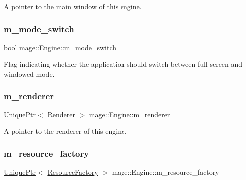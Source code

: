 A pointer to the main window of this engine. \hypertarget{classmage_1_1_engine_aa5cb2e0b7bb2c4a9020e79ab832ee221}{}\label{classmage_1_1_engine_aa5cb2e0b7bb2c4a9020e79ab832ee221} 
\subsubsection{\texorpdfstring{m\+\_\+mode\+\_\+switch}{m\_mode\_switch}}
{\footnotesize\ttfamily bool mage\+::\+Engine\+::m\+\_\+mode\+\_\+switch\hspace{0.3cm}{\ttfamily [private]}}

Flag indicating whether the application should switch between full screen and windowed mode. \hypertarget{classmage_1_1_engine_a1248b7c21bc8256c72d372c12ed1ee68}{}\label{classmage_1_1_engine_a1248b7c21bc8256c72d372c12ed1ee68} 
\subsubsection{\texorpdfstring{m\+\_\+renderer}{m\_renderer}}
{\footnotesize\ttfamily \hyperlink{namespacemage_a8c307fbcc33bce9b7f2aa4c26c3b95cf}{Unique\+Ptr}$<$ \hyperlink{classmage_1_1_renderer}{Renderer} $>$ mage\+::\+Engine\+::m\+\_\+renderer\hspace{0.3cm}{\ttfamily [private]}}

A pointer to the renderer of this engine. \hypertarget{classmage_1_1_engine_a0c7c2d4fc75fc3512e02054056cf8a90}{}\label{classmage_1_1_engine_a0c7c2d4fc75fc3512e02054056cf8a90} 
\subsubsection{\texorpdfstring{m\+\_\+resource\+\_\+factory}{m\_resource\_factory}}
{\footnotesize\ttfamily \hyperlink{namespacemage_a8c307fbcc33bce9b7f2aa4c26c3b95cf}{Unique\+Ptr}$<$ \hyperlink{classmage_1_1_resource_factory}{Resource\+Factory} $>$ mage\+::\+Engine\+::m\+\_\+resource\+\_\+factory\hspace{0.3cm}{\ttfamily [private]}}

